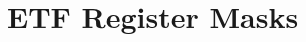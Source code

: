 \hypertarget{group___e_t_f___register___masks}{}\section{E\+TF Register Masks}
\label{group___e_t_f___register___masks}
